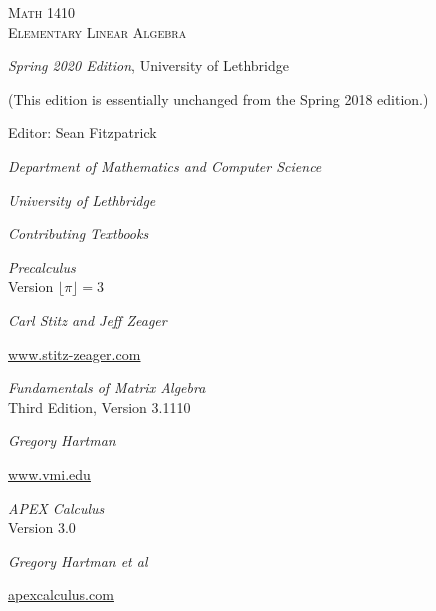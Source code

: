 
\hskip 125pt\begin{minipage}{\textwidth}
\begin{flushright}

\textsc{{\Huge Math 1410 \\
Elementary Linear Algebra}} \\

\bigskip

\textsl{\Large Spring 2020 Edition}, 
{\Large University of Lethbridge}

(This edition is essentially unchanged from the Spring 2018 edition.)

\bigskip

\Large
\vspace{1in}

Editor: Sean Fitzpatrick

\emph{\large Department of Mathematics and Computer Science}

\emph{\large University of Lethbridge}\vskip15pt

\parbox{200pt}{\textit{Contributing Textbooks}}\hskip 2cm \phantom{.}

\vspace{0.5in}

\textit{Precalculus}\\
{\large Version $\lfloor \pi\rfloor = 3$}

\emph{\large Carl Stitz and Jeff Zeager}

{\large \href{http://www.stitz-zeager.com}{\underline{www.stitz-zeager.com}}}\vskip 15pt

\textit{Fundamentals of Matrix Algebra}\\
{\large Third Edition, Version 3.1110}

\emph{\large Gregory Hartman}

{\large \href{http://www.vmi.edu/academics/departments/applied-mathematics/affordable-textbooks-apex/}{\underline{www.vmi.edu}}}\vskip 15pt

\textit{APEX Calculus}\\
{\large Version 3.0}

\emph{\large Gregory Hartman et al}

{\large \href{http://www.apexcalculus.com}{\underline{apexcalculus.com}}}\vskip 15pt


\normalsize
\end{flushright}
\end{minipage}

